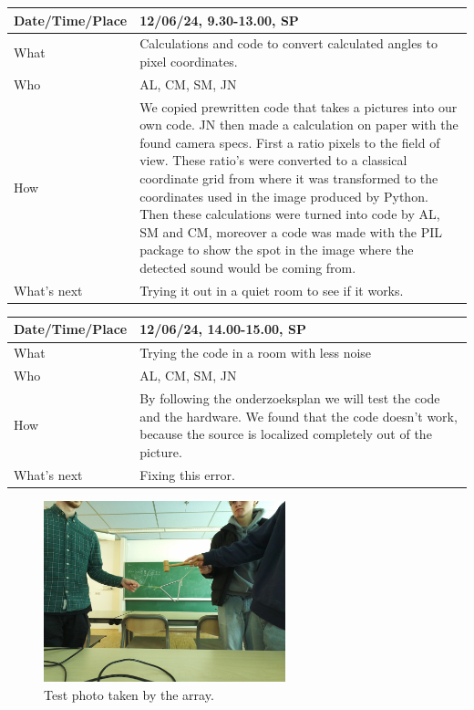\documentclass{article}
\begin{document}
\begin{table}[H]
\begin{tabular}{|p{1.5in}|p{4in}|}
\hline
Date/Time/Place & 12/06/24, 9.30-13.00, SP \\ \hline
What            & Calculations and code to convert calculated angles to pixel coordinates. \\ \hline
Who             & AL, CM, SM, JN \\ \hline
How             & We copied prewritten code that takes a pictures into our own code. JN then made a calculation on paper with the found camera specs. First a ratio pixels to the field of view. These ratio's were converted to a classical coordinate grid from where it was transformed to the coordinates used in the image produced by Python. Then these calculations were turned into code by AL, SM and CM, moreover a code was made with the PIL package to show the spot in the image where the detected sound would be coming from.\\ \hline
What's next     & Trying it out in a quiet room to see if it works.\\ \hline
\end{tabular}
\end{table}

\begin{table}[H]
\begin{tabular}{|p{1.5in}|p{4in}|}
\hline
Date/Time/Place &  12/06/24, 14.00-15.00, SP\\ \hline
What            & Trying the code in a room with less noise \\ \hline
Who             &  AL, CM, SM, JN\\ \hline
How             & By following the onderzoeksplan we will test the code and the hardware. We found that the code doesn't work, because the source is localized completely out of the picture.\\ \hline
What's next     & Fixing this error.\\ \hline
\end{tabular}
\end{table}

\begin{figure}[H]
    \centering
    \includegraphics[width=7cm]{savedimage.jpg}
    \caption{Test photo taken by the array.}   
\end{figure}
\end{document}
